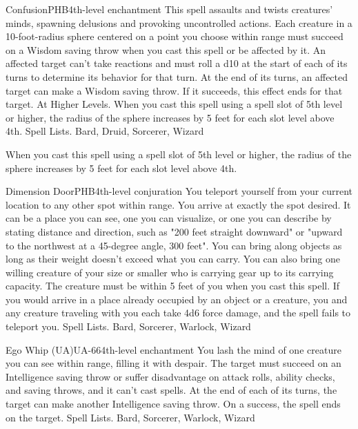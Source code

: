 \begin{spell}{Confusion}{PHB}{4th-level enchantment}
{
}
This spell assaults and twists creatures’ minds, spawning delusions and provoking uncontrolled actions. Each creature in a 10-foot-radius sphere centered on a point you choose within range must succeed on a Wisdom saving throw when you cast this spell or be affected by it.
An affected target can’t take reactions and must roll a d10 at the start of each of its turns to determine its behavior for that turn.
At the end of its turns, an affected target can make a Wisdom saving throw. If it succeeds, this effect ends for that target.
At Higher Levels. When you cast this spell using a spell slot of 5th level or higher, the radius of the sphere increases by 5 feet for each slot level above 4th.
Spell Lists. Bard, Druid, Sorcerer, Wizard

 When you cast this spell using a spell slot of 5th level or higher, the radius of the sphere increases by 5 feet for each slot level above 4th.
\end{spell}

\begin{spell}{Dimension Door}{PHB}{4th-level conjuration}
{
}
You teleport yourself from your current location to any other spot within range. You arrive at exactly the spot desired. It can be a place you can see, one you can visualize, or one you can describe by stating distance and direction, such as "200 feet straight downward" or "upward to the northwest at a 45-degree angle, 300 feet".
You can bring along objects as long as their weight doesn’t exceed what you can carry. You can also bring one willing creature of your size or smaller who is carrying gear up to its carrying capacity. The creature must be within 5 feet of you when you cast this spell.
If you would arrive in a place already occupied by an object or a creature, you and any creature traveling with you each take 4d6 force damage, and the spell fails to teleport you.
Spell Lists. Bard, Sorcerer, Warlock, Wizard
\end{spell}

\begin{spell}{Ego Whip (UA)}{UA-66}{4th-level enchantment}
{
}
You lash the mind of one creature you can see within range, filling it with despair. The target must succeed on an Intelligence saving throw or suffer disadvantage on attack rolls, ability checks, and saving throws, and it can’t cast spells. At the end of each of its turns, the target can make another Intelligence saving throw. On a success, the spell ends on the target.
Spell Lists. Bard, Sorcerer, Warlock, Wizard
\end{spell}

